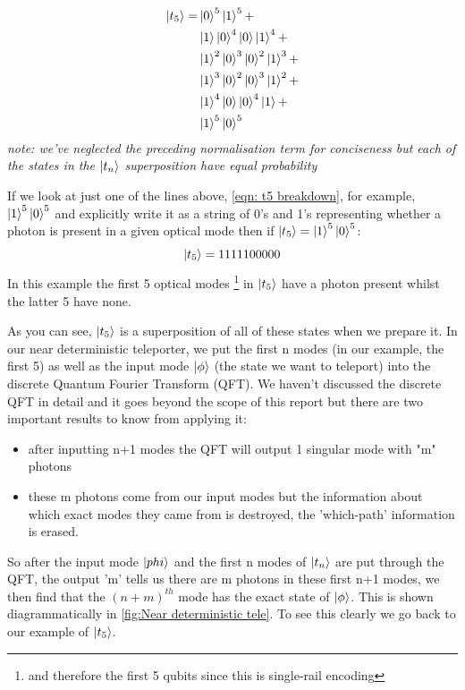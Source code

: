     \begin{align} 
        \ket{t_5} =  & \ket{0}^{5}\ket{1}^5 
        + \\ & \ket{1}\ket{0}^{4}\ket{0}\ket{1}^{4} + 
 \\ & \ket{1}^2\ket{0}^{3}\ket{0}^2\ket{1}^{3} \label{t5:1} + \\ & \ket{1}^3\ket{0}^{2}\ket{0}^3\ket{1}^{2}\label{t5:2} + \\  & \ket{1}^4\ket{0}\ket{0}^4\ket{1} + \\ & \ket{1}^{5}\ket{0}^5  
 \label{eqn: t5 breakdown}
\end{align}
\textit{note: we've neglected the preceding normalisation term for conciseness but each of the states in the $\ket{t_n}$ superposition have equal probability }
\par
If we look at just one of the lines above, \ref{eqn: t5 breakdown}, for example, $\ket{1}^5\ket{0}^5$ and explicitly write it as a string of 0's and 1's representing whether a photon is present in a given optical mode then if $\ket{t_5} = \ket{1}^5\ket{0}^5$:
    \begin{equation}
        \ket{t_5} = 1111100000
    \end{equation}
In this example the first 5 optical modes \footnote{and therefore the first 5 qubits since this is single-rail encoding} in $\ket{t_5}$ have a photon present whilst the latter 5 have none.
\par 
As you can see, $\ket{t_5}$ is a superposition of all of these states when we prepare it. In our near deterministic teleporter, we put the first n modes (in our example, the first 5) as well as the input mode $\ket{\phi}$ (the state we want to teleport) into the discrete Quantum Fourier Transform (QFT).  We haven't discussed the discrete QFT in detail and it goes beyond the scope of this report but there are two important results to know from applying it:
\begin{itemize}
    \item after inputting n+1 modes the QFT will output 1 singular mode with "m" photons
    \item these m photons come from our input modes but the information about which exact modes they came from is destroyed, the 'which-path' information is erased.
\end{itemize}
So after the input mode $\ket{phi}$ and the first n modes of $\ket{t_n}$ are put through the QFT, the output 'm' tells us there are m photons in these first n+1 modes, we then find that the $(n+m)^{th}$ mode has the exact state of $\ket{\phi}$. This is shown diagrammatically in \ref{fig:Near deterministic tele}. To see this clearly we go back to our example of $\ket{t_5}$.
